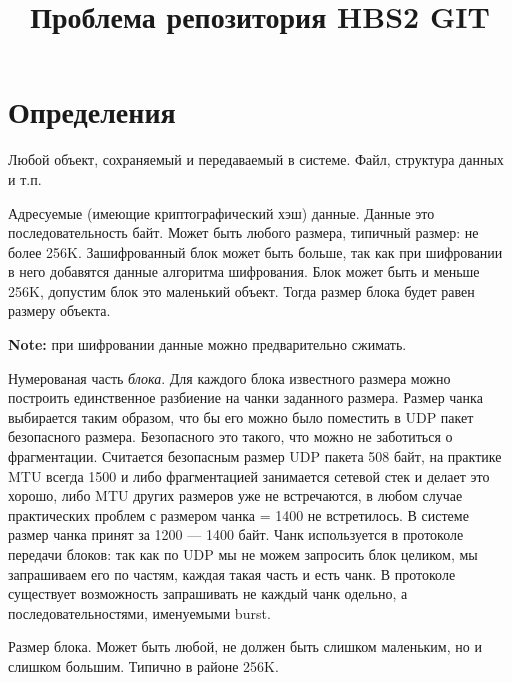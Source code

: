 \documentclass[11pt,a4paper]{article}
\title{Проблема репозитория HBS2 GIT}
\begin{document}
\maketitle

\section{Определения}

\begin{description}[itemsep=10pt]

  \item[Объект] Любой объект, сохраняемый и передаваемый в системе. Файл,
                структура данных и т.п.

  \item[Блок] Адресуемые (имеющие криптографический хэш) данные. Данные это последовательность байт.
              Может быть любого размера, типичный размер: не более 256K. Зашифрованный блок может
              быть больше, так как при шифровании в него добавятся данные алгоритма шифрования.
              Блок может быть и меньше 256K, допустим блок это маленький объект. Тогда размер блока
              будет равен размеру объекта.
              \par \textbf{Note:} при шифровании данные можно предварительно сжимать.


  \item[Чанк] Нумерованая часть \textit{блока}. Для каждого блока известного размера можно построить
              единственное разбиение на чанки заданного размера. Размер чанка выбирается таким
              образом, что бы его можно было поместить в UDP пакет безопасного размера.
              Безопасного это такого, что можно не заботиться о фрагментации. Считается безопасным
              размер UDP пакета 508 байт, на практике MTU всегда 1500 и либо фрагментацией
              занимается сетевой стек и делает это хорошо, либо MTU других размеров уже не
              встречаются, в любом случае практических проблем с размером чанка = 1400 не
              встретилось. В системе размер чанка принят за 1200 --- 1400 байт. Чанк используется
              в протоколе передачи блоков: так как по UDP мы не можем запросить блок целиком, мы
              запрашиваем его по частям, каждая такая часть и есть чанк. В протоколе существует
              возможность запрашивать не каждый чанк одельно, а последовательностями, именуемыми
              burst.

  \item[BlockSize] Размер блока. Может быть любой, не должен быть слишком
                   маленьким, но и слишком большим. Типично в районе 256K.


\end{description}
\end{document}
